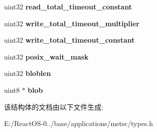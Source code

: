 \begin{DoxyCompactItemize}
uint32 {\bfseries read\+\_\+total\+\_\+timeout\+\_\+constant}
\item 
\mbox{\label{structrdpdr__parallel__device__info_a278147c52f4fe3b1553301fdd89c74fe}} 
uint32 {\bfseries write\+\_\+total\+\_\+timeout\+\_\+multiplier}
\item 
\mbox{\label{structrdpdr__parallel__device__info_a55dc390b7dc7d53c8076e90dafedc2ac}} 
uint32 {\bfseries write\+\_\+total\+\_\+timeout\+\_\+constant}
\item 
\mbox{\label{structrdpdr__parallel__device__info_af81a5146160efb6a83e1059ff383bc34}} 
uint32 {\bfseries posix\+\_\+wait\+\_\+mask}
\item 
\mbox{\label{structrdpdr__parallel__device__info_a86907bd351c62c5701c0dd3bc2bbadff}} 
uint32 {\bfseries bloblen}
\item 
\mbox{\label{structrdpdr__parallel__device__info_aa932b283af07bc9c0c5421efbb4d10cb}} 
uint8 $\ast$ {\bfseries blob}
\end{DoxyCompactItemize}


该结构体的文档由以下文件生成\+:\begin{DoxyCompactItemize}
\item 
E\+:/\+React\+O\+S-\/0../base/applications/mstsc/types.\+h\end{DoxyCompactItemize}
